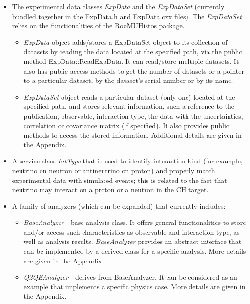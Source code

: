 \begin{itemize}
\item{The experimental data classes {\it ExpData} and the {\it ExpDataSet} (currently bundled together 
in the ExpData.h and ExpData.cxx files). The {\it ExpDataSet} relies on the functionalities of the RooMUHistos 
package\cite{roomuhistos}.
\begin{itemize}
\item{ {\it ExpData} object adds/stores a ExpDataSet object to its collection of datasets by reading the 
data located at the specified path, via the public method ExpData::ReadExpData. It can read/store multiple 
datasets. It also has public access methods to get the number of datasets or a pointer to a particular 
dataset, by the dataset's serial number or by its name.}
\item{ {\it ExpDataSet} object reads a particular dataset (only one) located at the specified path, and stores
relevant information, such a reference to the publication, observable, interaction type, the data with the 
uncertainties, correlation or covariance matrix (if specified). It also provides public methods to access 
the stored information. Additional details are given in the Appendix.
}
\end{itemize}
}  
\item{A service class {\it IntType} that is used to identify interaction kind (for example, neutrino on 
neutron or antineutrino on proton) and properly match experimental data with simulated events; this is 
related to the fact that neutrino may interact on a proton or a neutron in the CH target.}
\item{A family of analyzers (which can be expanded) that currently includes: 
\begin{itemize} 
\item{ {\it BaseAnalyzer} - base analysis class. It offers general functionalities to store and/or access
such characteristics as observable and interaction type, as well as analysis results. 
{\it BaseAnalyzer} provides an abstract interface that can be implemented by a derived class for 
a specific analysis. More details are given in the Appendix.
}
\item{ {\it Q2QEAnalyzer} - derives from BaseAnalyzer. It can be considered as an example that implements 
a specific physics case. 
More details are given in the Appendix.}
\end{itemize}
}
\end{itemize}
